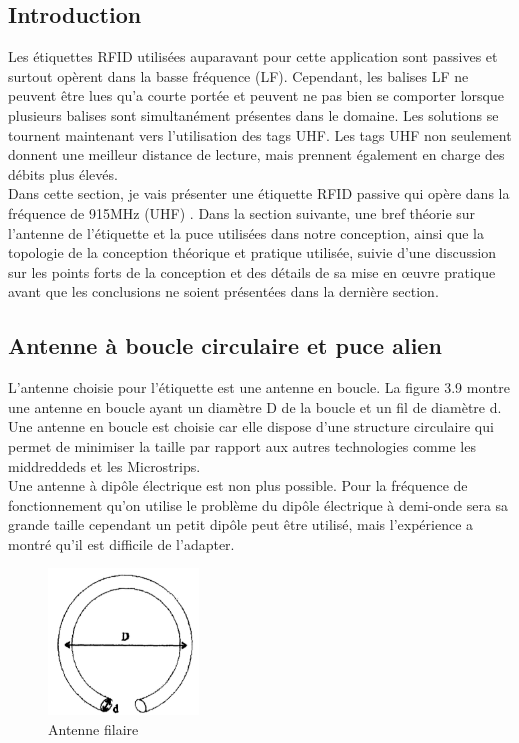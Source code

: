 \documentclass[11pt, a4paper, twoside]{book}
\begin{document}
\subsection{Introduction}
Les étiquettes RFID utilisées auparavant pour cette application sont passives et surtout opèrent dans la basse fréquence (LF). Cependant, les balises LF ne peuvent être lues qu'a courte portée et peuvent ne pas bien se comporter lorsque plusieurs balises sont simultanément présentes dans le domaine. Les solutions se tournent maintenant vers l'utilisation des tags UHF. Les tags UHF non seulement donnent une meilleur distance de lecture, mais prennent également en charge des débits plus élevés. \\

Dans cette section, je vais présenter  une étiquette RFID passive qui opère dans la fréquence de 915MHz (UHF) . Dans la section suivante, une bref  théorie  sur l'antenne de l'étiquette et la puce utilisées dans notre conception, ainsi que la topologie de la conception théorique et pratique utilisée, suivie d'une discussion sur les points forts de la conception et des détails de sa mise en œuvre pratique avant que les conclusions ne soient présentées dans la dernière section.
\subsection{Antenne à boucle circulaire et puce alien}
L'antenne choisie pour l'étiquette est une antenne en boucle. La figure 3.9 montre une antenne en boucle ayant un diamètre D de la boucle et un fil de diamètre d. Une antenne en boucle est choisie car elle dispose d'une structure circulaire qui permet de minimiser la taille par rapport aux autres technologies comme les middreddeds et les Microstrips.\\

Une antenne à dipôle électrique est non plus possible. Pour la fréquence de fonctionnement qu'on utilise le problème du dipôle électrique à demi-onde sera sa grande taille cependant un petit dipôle peut être utilisé, mais l'expérience a montré qu'il est difficile de l'adapter.
\begin{figure}[H]
\centering
\includegraphics[width=4cm]{cla}
\caption{Antenne filaire}
\end{figure}
\end{document}
